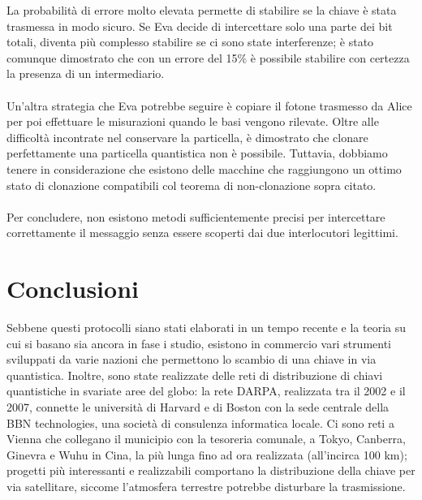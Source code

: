 \documentclass[italian,A4,12pt]{article}
\begin{document}
    La probabilità di errore molto elevata permette di stabilire se la chiave è stata trasmessa in modo sicuro.
    Se Eva decide di intercettare solo una parte dei bit totali, diventa più complesso stabilire se ci sono state interferenze; è stato comunque dimostrato che con un errore del 15\% è possibile stabilire con certezza la presenza di un intermediario.\\\\
    Un'altra strategia che Eva potrebbe seguire è copiare il fotone trasmesso da Alice per poi effettuare le misurazioni quando le basi vengono rilevate. Oltre alle difficoltà incontrate nel conservare la particella, è dimostrato che clonare perfettamente una particella quantistica non è possibile.
    Tuttavia, dobbiamo tenere in considerazione che esistono delle macchine che raggiungono un ottimo stato di clonazione compatibili col teorema di non-clonazione sopra citato.\\\\
     Per concludere, non esistono metodi sufficientemente precisi per intercettare correttamente il messaggio senza essere scoperti dai due interlocutori legittimi.
     \newpage
  \section{Conclusioni}
     Sebbene questi protocolli siano stati elaborati in un tempo recente e la teoria su cui si basano sia ancora in fase i studio, esistono in commercio vari strumenti sviluppati da varie nazioni che permettono lo scambio di una chiave in via quantistica.
     Inoltre, sono state realizzate delle reti di distribuzione di chiavi quantistiche in svariate aree del globo: la rete DARPA, realizzata tra il 2002 e il 2007, connette le università di Harvard e di Boston con la sede centrale della BBN technologies, una società di consulenza informatica locale.
     Ci sono reti a Vienna che collegano il municipio con la tesoreria comunale, a Tokyo, Canberra, Ginevra e Wuhu in Cina, la più lunga fino ad ora realizzata (all'incirca 100 km); progetti più interessanti e realizzabili comportano la distribuzione della chiave per via satellitare, siccome l'atmosfera terrestre potrebbe disturbare la trasmissione.\\\\
\end{document}
